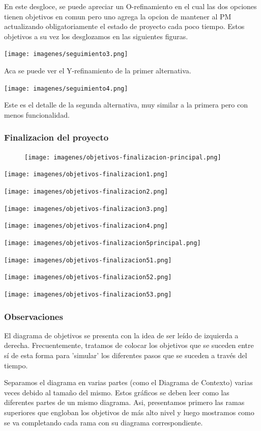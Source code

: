 En este desgloce, se puede apreciar un O-refinamiento en el cual las dos opciones tienen objetivos en comun pero uno agrega la opcion de mantener al PM actualizando obligatoriamente el estado de proyecto cada poco tiempo. Estos objetivos a su vez los desglozamos en las siguientes figuras.

\texttt{[image: imagenes/seguimiento3.png]}

Aca se puede ver el Y-refinamiento de la primer alternativa.

\texttt{[image: imagenes/seguimiento4.png]}

Este es el detalle de la segunda alternativa, muy similar a la primera pero con menos funcionalidad.

\newpage

\subsubsection{Finalizacion del proyecto}

\begin{figure}[H]
    \centering
    \texttt{[image: imagenes/objetivos-finalizacion-principal.png]}
\end{figure}

\texttt{[image: imagenes/objetivos-finalizacion1.png]}

\texttt{[image: imagenes/objetivos-finalizacion2.png]}

\texttt{[image: imagenes/objetivos-finalizacion3.png]}

\texttt{[image: imagenes/objetivos-finalizacion4.png]}

\texttt{[image: imagenes/objetivos-finalizacion5principal.png]}

\texttt{[image: imagenes/objetivos-finalizacion51.png]}

\texttt{[image: imagenes/objetivos-finalizacion52.png]}

\texttt{[image: imagenes/objetivos-finalizacion53.png]}

\newpage

\subsubsection{Observaciones}

El diagrama de objetivos se presenta con la idea de ser leído de izquierda a derecha. Frecuentemente, tratamos de colocar los objetivos que se suceden entre sí de esta forma para 'simular' los diferentes pasos que se suceden a través del tiempo.

Separamos el diagrama en varias partes (como el Diagrama de Contexto) varias veces debido al tamaño del mismo. Estos gráficos se deben leer como las diferentes partes de un mismo diagrama. Asi, presentamos primero las ramas superiores que engloban los objetivos de más alto nivel y luego mostramos como se va completando cada rama con su diagrama correspondiente.
